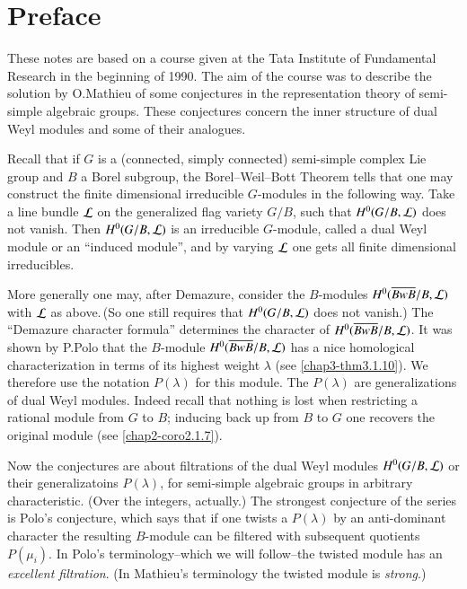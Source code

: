\chapter{Preface}


These notes are based on a course given at the Tata Institute of
Fundamental Research in the beginning of 1990. The aim of the course
was to describe the solution by O.\@ Mathieu of some conjectures in
the representation theory of semi-simple algebraic groups. These
conjectures concern the inner structure of dual Weyl modules and some
of their analogues.

Recall that if $G$ is a (connected, simply connected) semi-simple
complex Lie group and $B$ a Borel subgroup, the Borel--Weil--Bott
Theorem tells that one may construct the finite dimensional
irreducible $G$-modules in the following way. Take a line bundle $\mathcal{L}$
on the generalized flag variety $G/B$, such that $H^{0}(G/B,\mathcal{L})$ does
not vanish. Then $H^{0}(G/B,\mathcal{L})$ is an irreducible $G$-module, called
a dual Weyl module or an ``induced module'', and by varying $\mathcal{L}$ one
gets all finite dimensional irreducibles.

More generally one may, after Demazure, consider the $B$-modules
$H^{0}(\overline{BwB}/B,\mathcal{L})$ with $\mathcal{L}$ as above.\,(So one still
requires that $H^{0}(G/B,\mathcal{L})$ does not vanish.) The ``Demazure
character formula'' determines the character of
$H^{0}(\overline{BwB}/B,\mathcal{L})$. It was shown by P.\@ Polo that the
$B$-module $H^{0}(\overline{BwB}/B,\mathcal{L})$ has a nice homological
characterization in terms of its highest weight $\lambda$ (see
\ref{chap3-thm3.1.10}). We therefore use the notation $P(\lambda)$ for
this module. The $P(\lambda)$ are generalizations of dual Weyl
modules. Indeed recall that nothing is lost when restricting a
rational module from $G$ to $B$; inducing back up from $B$ to $G$ one
recovers the original module (see \ref{chap2-coro2.1.7}).

Now the conjectures are about filtrations of the dual Weyl modules
$H^{0}(G/B,\mathcal{L})$ or their generalizatoins $P(\lambda)$, for semi-simple
algebraic groups in arbitrary characteristic. (Over the integers,
actually.) The strongest conjecture of the series is Polo's
conjecture, which says that if one twists a $P(\lambda)$ by an
anti-dominant character the resulting $B$-module can be filtered with
subsequent quotients $P(\mu_{i})$. In Polo's terminology--which we
will follow--the twisted module has an {\em excellent filtration}. (In
Mathieu's terminology the twisted module is {\em strong}.)

